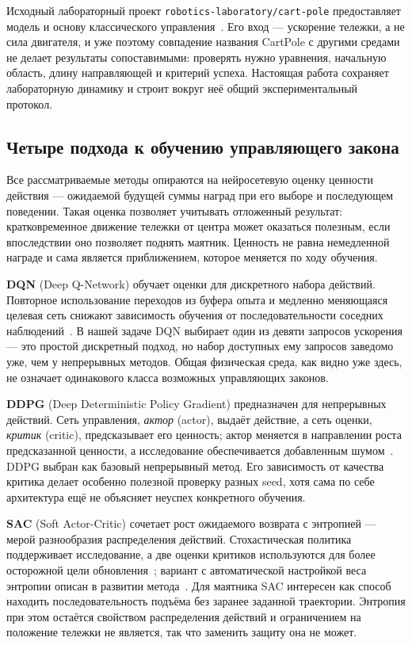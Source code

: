Исходный лабораторный проект \texttt{robotics-laboratory/cart-pole} предоставляет модель и основу классического управления~\cite{laboratory}. Его вход — ускорение тележки, а не сила двигателя, и уже поэтому совпадение названия CartPole с другими средами не делает результаты сопоставимыми: проверять нужно уравнения, начальную область, длину направляющей и критерий успеха. Настоящая работа сохраняет лабораторную динамику и строит вокруг неё общий экспериментальный протокол.

\subsection{Четыре подхода к обучению управляющего закона}
Все рассматриваемые методы опираются на нейросетевую оценку ценности действия — ожидаемой будущей суммы наград при его выборе и последующем поведении. Такая оценка позволяет учитывать отложенный результат: кратковременное движение тележки от центра может оказаться полезным, если впоследствии оно позволяет поднять маятник. Ценность не равна немедленной награде и сама является приближением, которое меняется по ходу обучения.

\textbf{DQN} (Deep Q-Network) обучает оценки для дискретного набора действий. Повторное использование переходов из буфера опыта и медленно меняющаяся целевая сеть снижают зависимость обучения от последовательности соседних наблюдений~\cite{mnih}. В нашей задаче DQN выбирает один из девяти запросов ускорения — это простой дискретный подход, но набор доступных ему запросов заведомо уже, чем у непрерывных методов. Общая физическая среда, как видно уже здесь, не означает одинакового класса возможных управляющих законов.

\textbf{DDPG} (Deep Deterministic Policy Gradient) предназначен для непрерывных действий. Сеть управления, \emph{актор} (actor), выдаёт действие, а сеть оценки, \emph{критик} (critic), предсказывает его ценность; актор меняется в направлении роста предсказанной ценности, а исследование обеспечивается добавленным шумом~\cite{lillicrap}. DDPG выбран как базовый непрерывный метод. Его зависимость от качества критика делает особенно полезной проверку разных seed, хотя сама по себе архитектура ещё не объясняет неуспех конкретного обучения.

\textbf{SAC} (Soft Actor-Critic) сочетает рост ожидаемого возврата с энтропией — мерой разнообразия распределения действий. Стохастическая политика поддерживает исследование, а две оценки критиков используются для более осторожной цели обновления~\cite{haarnoja_sac}; вариант с автоматической настройкой веса энтропии описан в развитии метода~\cite{haarnoja_apps}. Для маятника SAC интересен как способ находить последовательность подъёма без заранее заданной траектории. Энтропия при этом остаётся свойством распределения действий и ограничением на положение тележки не является, так что заменить защиту она не может.

